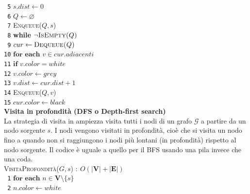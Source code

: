 \documentclass[10pt,landscape]{article}
\begin{document}
\begin{multicols*}{4}
                \verb| 5|\hspace*{0.5em} $s.dist \leftarrow 0$\\
                \verb| 6|\hspace*{0.5em} $Q \leftarrow \varnothing$\\
                \verb| 7|\hspace*{0.5em} \textsc{Enqueue($Q,s$)}\\
                \verb| 8|\hspace*{0.5em} \textbf{while} $\lnot \textsc{IsEmpty($Q$)}$\\
                \verb| 9|\hspace*{1.5em} $cur \leftarrow \textsc{Dequeue($Q$)}$\\
                \verb|10|\hspace*{1.5em} $\textbf{for each } v \in cur.adiacenti$\\
                \verb|11|\hspace*{2.5em} $\textbf{if } v.color = white$\\
                \verb|12|\hspace*{3.5em} $v.color \leftarrow grey$\\
                \verb|13|\hspace*{3.5em} $v.dist \leftarrow cur.dist+1$\\
                \verb|14|\hspace*{3.5em} \textsc{Enqueue($Q,v$)}\\
                \verb|15|\hspace*{1.5em} $cur.color \leftarrow black$\\ [5pt]
                \textbf{Visita in profondità (DFS o Depth-first search)}\\ [3pt]
                La strategia di visita in ampiezza visita tutti i nodi di un grafo $\mathcal{G}$ a partire da un nodo sorgente $s$. I nodi vengono visitati in profondità, cioè che si visita un nodo fino a quando non si raggiungono i nodi più lontani (in profondità) rispetto al nodo sorgente. Il codice è uguale a quello per il BFS usando una pila invece che una coda.\\ [5pt]
                \textsc{VisitaProfondità($G,s$)} $:\ O(|\textbf{V}|+|\textbf{E}|)$\\ [3pt]
                \verb| 1|\hspace*{0.5em} $\textbf{for each } n \in \textbf{V} \setminus \{s\}$\\
                \verb| 2|\hspace*{1.5em} $n.color \leftarrow white$\\

\end{multicols*}
\end{document}
